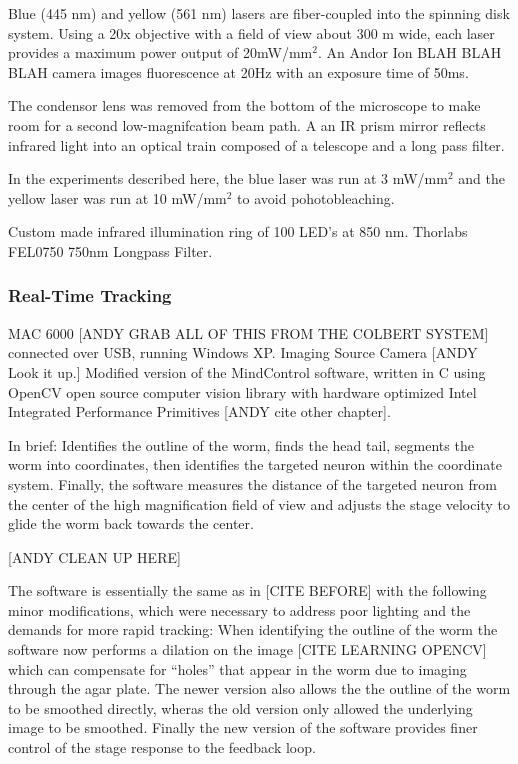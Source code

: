 Blue (445 nm) and yellow (561 nm) lasers are fiber-coupled into the spinning disk system. Using a 20x objective with a field of view  about 300 \textmu m wide, each laser  provides a maximum power output of 20mW/mm$^2$. An Andor Ion BLAH BLAH BLAH camera images fluorescence at 20Hz with an exposure time of 50ms. 

The condensor lens was removed from the bottom of the microscope to make room for a second low-magnifcation beam path. A an IR prism mirror reflects infrared light into an optical train composed of a telescope and a long pass filter.  

In the experiments described here, the blue laser was run at 3 mW/mm$^2$ and the yellow laser was run at 10 mW/mm$^2$ to avoid pohotobleaching. 

Custom made infrared illumination ring of 100 LED's at 850 nm. 
Thorlabs FEL0750  750nm Longpass Filter.





\subsubsection{Real-Time Tracking} \label{sec:omegaSoftware}
MAC 6000 [ANDY GRAB ALL OF THIS FROM THE COLBERT SYSTEM] connected over USB, running Windows XP. 
Imaging Source Camera [ANDY Look it up.]
Modified version of the MindControl software, written in C using OpenCV open source computer vision library with hardware optimized Intel Integrated Performance Primitives [ANDY cite other chapter]. 

In brief:
Identifies the outline of the worm, finds the head tail, segments the worm into coordinates, then identifies the targeted neuron within the coordinate system. Finally, the software measures the distance of the targeted neuron from the center of the high magnification field of view and adjusts the stage velocity to glide the worm back towards the center. 

[ANDY CLEAN UP HERE]


The software is essentially the same as in [CITE BEFORE] with the following minor modifications, which were necessary to address poor lighting and the demands for more rapid tracking: When identifying the outline of the worm the software now performs a dilation on the image [CITE LEARNING OPENCV] which can compensate for ``holes'' that appear in the worm due to imaging through the agar plate. The newer version also allows the the outline of the worm to be smoothed directly, wheras the old version only allowed the underlying image to be smoothed. Finally the new version of the software provides finer control of the stage response to the feedback loop. 




